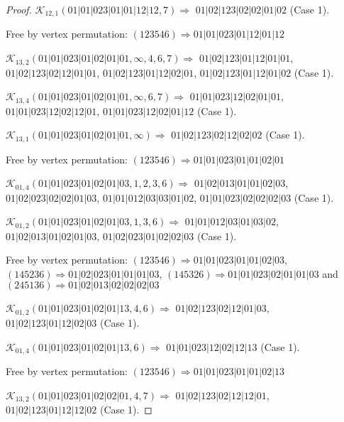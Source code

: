 \documentclass[12pt]{article}
\theoremstyle{plain}
\theoremstyle{definition}
\theoremstyle{remark}
\newcommand{\fancy}[1]{\mathcal{#1}}
\def\K{\fancy{K}}
\begin{document}
\begin{proof}
	$\K_{12,1}(01|01|023|01|01|12|12,7)\Rightarrow $ $01|02|123|02|02|01|02$ (Case 1).
	
	
	
	Free by vertex permutation: $(1 2 3 5 4 6)\Rightarrow 01|01|023|01|12|01|12$
	
	
	
	\bigskip
	
	$\K_{13,2}(01|01|023|01|02|01|01,\infty,4, 6, 7)\Rightarrow $ $01|02|123|01|12|01|01$, $01|02|123|02|12|01|01$, $01|02|123|01|12|02|01$, $01|02|123|01|12|01|02$ (Case 1).
	
	$\K_{13,4}(01|01|023|01|02|01|01,\infty,6, 7)\Rightarrow $ $01|01|023|12|02|01|01$, $01|01|023|12|02|12|01$, $01|01|023|12|02|01|12$ (Case 1).
	
	$\K_{13,1}(01|01|023|01|02|01|01,\infty)\Rightarrow $ $01|02|123|02|12|02|02$ (Case 1).
	
	
	
	Free by vertex permutation: $(1 2 3 5 4 6)\Rightarrow 01|01|023|01|01|02|01$
	
	
	
	\bigskip
	
	$\K_{01,4}(01|01|023|01|02|01|03,1, 2, 3, 6)\Rightarrow $ $01|02|013|01|01|02|03$, $01|02|023|02|02|01|03$, $01|01|012|03|03|01|02$, $01|01|023|02|02|02|03$ (Case 1).
	
	$\K_{01,2}(01|01|023|01|02|01|03,1, 3, 6)\Rightarrow $ $01|01|012|03|01|03|02$, $01|02|013|01|02|01|03$, $01|02|023|01|02|02|03$ (Case 1).
	
	
	
	Free by vertex permutation: $(1 2 3 5 4 6)\Rightarrow 01|01|023|01|01|02|03$, $(1 4 5 2 3 6)\Rightarrow 01|02|023|01|01|01|03$, $(1 4 5 3 2 6)\Rightarrow 01|01|023|02|01|01|03$ and $(2 4 5 1 3 6)\Rightarrow 01|02|013|02|02|02|03$
	
	
	
	\bigskip
	
	$\K_{01,2}(01|01|023|01|02|01|13,4, 6)\Rightarrow $ $01|02|123|02|12|01|03$, $01|02|123|01|12|02|03$ (Case 1).
	
	$\K_{01,4}(01|01|023|01|02|01|13,6)\Rightarrow $ $01|01|023|12|02|12|13$ (Case 1).
	
	
	
	Free by vertex permutation: $(1 2 3 5 4 6)\Rightarrow 01|01|023|01|01|02|13$
	
	
	
	\bigskip
	
	$\K_{13,2}(01|01|023|01|02|02|01,4, 7)\Rightarrow $ $01|02|123|02|12|12|01$, $01|02|123|01|12|12|02$ (Case 1).
	

\end{proof}
\end{document}
